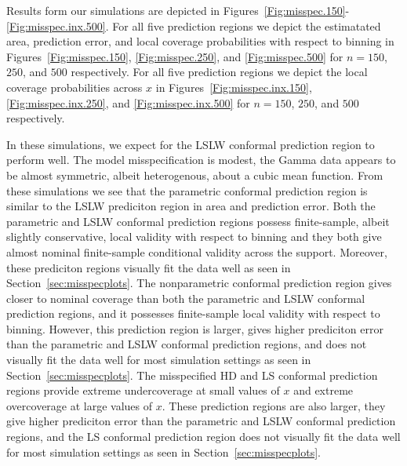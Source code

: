 \documentclass[11pt]{article}\usepackage[]{graphicx}\usepackage[]{color}
\begin{document}
Results form our simulations are depicted in 
Figures~\ref{Fig:misspec.150}-\ref{Fig:misspec.inx.500}.  
For all five prediction regions we depict the estimatated area, prediction 
error, and local coverage probabilities with respect to binning in 
Figures~\ref{Fig:misspec.150}, \ref{Fig:misspec.250}, and 
\ref{Fig:misspec.500} for $n = 150$, $250$, and $500$ respectively.  For all 
five prediction regions we depict the local coverage probabilities across $x$ 
in Figures~\ref{Fig:misspec.inx.150}, \ref{Fig:misspec.inx.250}, and 
\ref{Fig:misspec.inx.500} for $n = 150$, $250$, and $500$ respectively.

In these simulations, we expect for the LSLW conformal prediction region to 
perform well.  The model misspecification is modest, the Gamma data  
appears to be almost symmetric, albeit heterogenous, about a cubic mean 
function.  From these simulations we see that the parametric conformal 
prediction region is similar to the LSLW prediciton region in area and 
prediction error.  Both the parametric and LSLW conformal 
prediction regions possess finite-sample, albeit slightly conservative, 
local validity with respect to binning and they both give almost nominal 
finite-sample conditional validity across the support.
Moreover, these prediciton regions visually fit the data well as seen in 
Section~\ref{sec:misspecplots}.
The nonparametric conformal prediction region gives closer to nominal 
coverage than both the parametric and LSLW conformal prediction regions, 
and it possesses finite-sample local validity with respect to 
binning.  However, this prediction region is larger, gives higher 
prediciton error than the parametric and LSLW conformal prediction 
regions, and does not visually fit the data well for most simulation settings 
as seen in Section~\ref{sec:misspecplots}.  The misspecified HD and LS 
conformal prediction regions  provide extreme undercoverage at small values 
of $x$ and extreme overcoverage at large values of $x$.  These prediction 
regions are also larger, they give higher prediciton error than the 
parametric and LSLW conformal prediction regions, and the LS conformal 
prediction region does not visually fit the data well for most simulation 
settings as seen in Section~\ref{sec:misspecplots}. 
\end{document}
